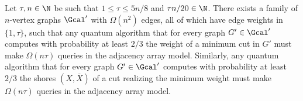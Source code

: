 \begin{theorem}
\label{thm:adjlowerL}
Let $\tau, n \in \N$ be such that $1 \le \tau \le 5n/8$ and $\tau n/20 \in \N$.
There exists a family of $n$-vertex graphs $\Gcal'$ with $\Omega(n^2)$ edges, all of which have edge weights in $\{1,\tau\}$, such that any quantum algorithm that for every graph $G' \in \Gcal'$ computes with probability at least $2/3$ the weight of a minimum cut in $G'$ must make $\Omega(n \tau)$ queries in the adjacency array model.  Similarly, any quantum algorithm that for every graph $G' \in \Gcal'$ computes with probability at least $2/3$ the shores $(X,\overline{X})$ of a cut realizing the minimum weight must make $\Omega(n \tau)$ queries in the adjacency array model.
\end{theorem}
